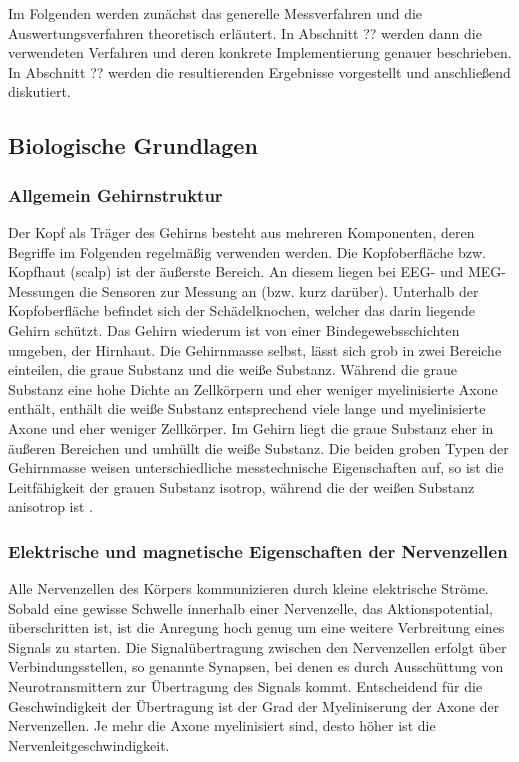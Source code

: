 \documentclass[doc,a4paper,12pt]{apa6}
\begin{document}
Im Folgenden werden zunächst das generelle Messverfahren und die Auswertungsverfahren theoretisch erläutert. In Abschnitt ?? werden dann die verwendeten Verfahren und deren konkrete Implementierung genauer beschrieben. In Abschnitt ?? werden die resultierenden Ergebnisse vorgestellt und anschließend diskutiert.


\subsection{Biologische Grundlagen}

\subsubsection{Allgemein Gehirnstruktur}

Der Kopf als Träger des Gehirns besteht aus mehreren Komponenten, deren Begriffe im Folgenden regelmäßig verwenden werden. Die Kopfoberfläche bzw. Kopfhaut (scalp) ist der äußerste Bereich. An diesem liegen bei EEG- und MEG-Messungen die Sensoren zur Messung an (bzw. kurz darüber). Unterhalb der Kopfoberfläche befindet sich der Schädelknochen, welcher das darin liegende Gehirn schützt. Das Gehirn wiederum ist von einer Bindegewebsschichten umgeben, der Hirnhaut. Die Gehirnmasse selbst, lässt sich grob in zwei Bereiche einteilen, die graue Substanz und die weiße Substanz. Während die graue Substanz eine hohe Dichte an Zellkörpern und eher weniger myelinisierte Axone enthält, enthält die weiße Substanz entsprechend viele lange und myelinisierte Axone und eher weniger Zellkörper. Im Gehirn liegt die graue Substanz eher in äußeren Bereichen und umhüllt die weiße Substanz. Die beiden groben Typen der Gehirnmasse weisen unterschiedliche messtechnische Eigenschaften auf, so ist die Leitfähigkeit der grauen Substanz isotrop, während die der weißen Substanz anisotrop ist \parencite{logothetis2007vivo}.

\subsubsection{Elektrische und magnetische Eigenschaften der Nervenzellen}

Alle Nervenzellen des Körpers kommunizieren durch kleine elektrische Ströme. Sobald eine gewisse Schwelle innerhalb einer Nervenzelle, das Aktionspotential, überschritten ist, ist die Anregung hoch genug um eine weitere Verbreitung eines Signals zu starten. Die Signalübertragung zwischen den Nervenzellen erfolgt über Verbindungsstellen, so genannte Synapsen, bei denen es durch Ausschüttung von Neurotransmittern zur Übertragung des Signals kommt. Entscheidend für die Geschwindigkeit der Übertragung ist der Grad der Myeliniserung der Axone der Nervenzellen. Je mehr die Axone myelinisiert sind, desto höher ist die Nervenleitgeschwindigkeit.
\end{document}
